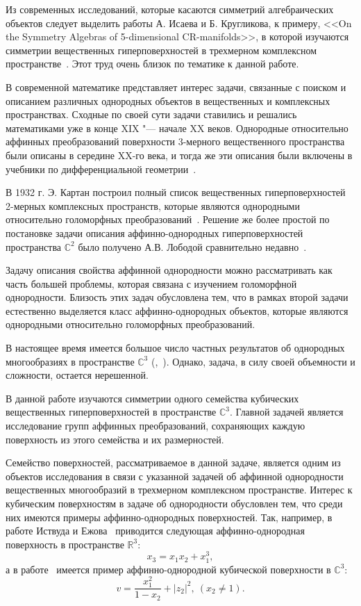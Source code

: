 \documentclass[../main.tex]{subfiles}
\begin{document}
Из современных исследований, которые касаются симметрий алгебраических объектов следует выделить работы А. Исаева и Б. Кругликова, к примеру, <<On the Symmetry Algebras of 5-dimensional CR-manifolds>>, в которой изучаются симметрии вещественных гиперповерхностей в трехмерном комплексном пространстве~\cite{IK}. Этот труд очень близок по тематике к данной работе.

В современной математике представляет интерес задачи, связанные с поиском и описанием различных однородных объектов в вещественных и комплексных пространствах. Сходные по своей сути задачи ставились и решались математиками уже в конце XIX "--- начале XX веков. Однородные относительно аффинных преобразований поверхности 3-мерного вещественного пространства были описаны в середине XX-го века, и тогда же эти описания были включены в учебники по дифференциальной геометрии~\cite{shirokov}.

В 1932 г. Э. Картан построил полный список вещественных гиперповерхностей 2-мерных комплексных пространств, которые являются однородными относительно голоморфных преобразований~\cite{cartan}. Решение же более простой по постановке задачи описания аффинно-однородных гиперповерхностей пространства $\mathbb{C}^2$ было получено А.В. Лободой сравнительно недавно~\cite{loboda_c2}.

Задачу описания свойства аффинной однородности можно рассматривать как часть большей проблемы, которая связана с изучением голоморфной однородности. Близость этих задач обусловлена тем, что в рамках второй задачи естественно выделяется класс аффинно-однородных объектов, которые являются однородными относительно голоморфных преобразований.

В настоящее время имеется большое число частных результатов об однородных многообразиях в пространстве $\mathbb{C}^3$ (\cite{ALS},~\cite{loboda_hodarev}). Однако, задача, в силу своей объемности и сложности, остается нерешенной.


В данной работе изучаются симметрии одного семейства кубических вещественных гиперповерхностей в пространстве $\mathbb{C}^3$. Главной задачей является исследование групп аффинных преобразований, сохраняющих каждую поверхность из этого семейства и их размерностей.

Семейство поверхностей, рассматриваемое в данной задаче, является одним из объектов исследования в связи с указанной задачей об аффинной однородности вещественных многообразий в трехмерном комплексном пространстве. Интерес к кубическим поверхностям в задаче об однородности обусловлен тем, что среди них имеются примеры аффинно-однородных поверхностей. Так, например, в работе Иствуда и Ежова~\cite{eastwood} приводится следующая аффинно-однородная поверхность в пространстве $\mathbb{R}^3$:
$$
x_3 = x_1 x_2 + x_1^3,
$$
а в работе~\cite{ALS} имеется пример аффинно-однородной кубической поверхности в $\mathbb{C}^3$:
$$
v = \frac{x_1^2}{1 - x_2} + |z_2|^2,\ (x_2 \ne 1).
$$
\end{document}
